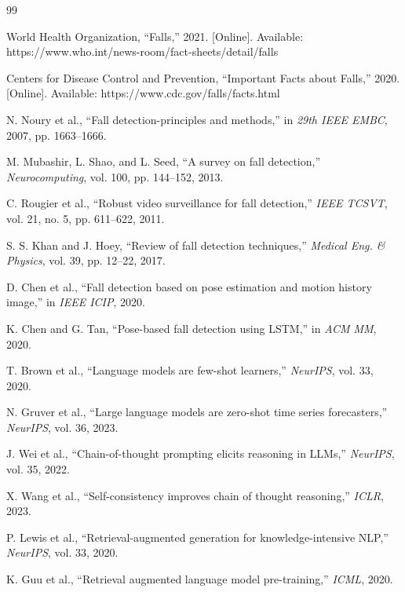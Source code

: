 \documentclass[conference]{IEEEtran}
\begin{document}

\begin{thebibliography}{99}

World Health Organization, ``Falls,'' 2021. [Online]. Available: https://www.who.int/news-room/fact-sheets/detail/falls

Centers for Disease Control and Prevention, ``Important Facts about Falls,'' 2020. [Online]. Available: https://www.cdc.gov/falls/facts.html

N. Noury et al., ``Fall detection-principles and methods,'' in \textit{29th IEEE EMBC}, 2007, pp. 1663--1666.

M. Mubashir, L. Shao, and L. Seed, ``A survey on fall detection,'' \textit{Neurocomputing}, vol. 100, pp. 144--152, 2013.

C. Rougier et al., ``Robust video surveillance for fall detection,'' \textit{IEEE TCSVT}, vol. 21, no. 5, pp. 611--622, 2011.

S. S. Khan and J. Hoey, ``Review of fall detection techniques,'' \textit{Medical Eng. \& Physics}, vol. 39, pp. 12--22, 2017.

D. Chen et al., ``Fall detection based on pose estimation and motion history image,'' in \textit{IEEE ICIP}, 2020.

K. Chen and G. Tan, ``Pose-based fall detection using LSTM,'' in \textit{ACM MM}, 2020.

T. Brown et al., ``Language models are few-shot learners,'' \textit{NeurIPS}, vol. 33, 2020.

N. Gruver et al., ``Large language models are zero-shot time series forecasters,'' \textit{NeurIPS}, vol. 36, 2023.

J. Wei et al., ``Chain-of-thought prompting elicits reasoning in LLMs,'' \textit{NeurIPS}, vol. 35, 2022.

X. Wang et al., ``Self-consistency improves chain of thought reasoning,'' \textit{ICLR}, 2023.

P. Lewis et al., ``Retrieval-augmented generation for knowledge-intensive NLP,'' \textit{NeurIPS}, vol. 33, 2020.

K. Guu et al., ``Retrieval augmented language model pre-training,'' \textit{ICML}, 2020.

\end{thebibliography}
\end{document}
